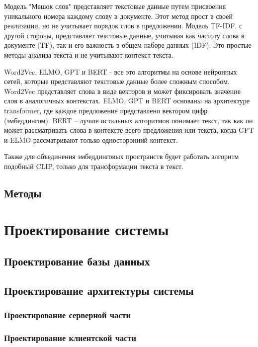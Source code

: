 \documentclass[PI, VKR]{HSEUniversity}
\begin{document}
Модель "Мешок слов" представляет текстовые данные путем присвоения уникального номера каждому слову в документе. Этот метод прост в своей реализации, но не учитывает порядок слов в предложении. Модель TF-IDF, с другой стороны, представляет текстовые данные, учитывая как частоту слова в документе (TF), так и его важность в общем наборе данных (IDF). Это простые методы анализа текста и не учитывают контекст текста.

Word2Vec, ELMO, GPT и BERT - все это алгоритмы на основе нейронных сетей, которые представляют текстовые данные более сложным способом. Word2Vec представляет слова в виде векторов и может фиксировать значение слов в аналогичных контекстах. ELMO, GPT и BERT основаны на архитектуре transformer, где каждое предложение представлено вектором цифр (эмбеддингом). BERT -- лучше остальных алгоритмов понимает текст, так как он может рассматривать слова в контексте всего предложения или текста, когда GPT и ELMO рассматривают только односторонний контекст.

Также для объединения эмбеддинговых пространств будет работать алгоритм подобный CLIP\autocite{radford2021learning}, только для трансформации текста в текст.
\section{Методы}
\label{sec:org1b7a051}
\chapter{Проектирование системы}
\label{sec:org2a12c33}
\section{Проектирование базы данных}
\label{sec:org194e08b}

\section{Проектирование архитектуры системы}
\label{sec:orgf6ba02b}
\subsection{Проектирование серверной части}
\label{sec:org1f66248}
\subsection{Проектирование клиентской части}
\label{sec:org3076ae3}
\end{document}
